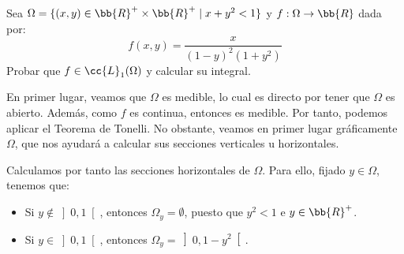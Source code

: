\begin{ejercicio}
    Sea $\Omega=\{(x,y)\in \bb{R}^+\times \bb{R}^+\mid x+y^2<1\}$ y $f:\Omega\to \bb{R}$ dada por:
    \[ f(x,y)=\dfrac{x}{(1-y)^2(1+y^2)} \]
    Probar que $f\in \cc{L}_1(\Omega)$ y calcular su integral.

    En primer lugar, veamos que $\Omega$ es medible, lo cual es directo por tener que $\Omega$ es abierto. Además, como $f$ es continua, entonces
    es medible. Por tanto, podemos aplicar el Teorema de Tonelli.
    No obstante, veamos en primer lugar gráficamente $\Omega$, que nos ayudará a calcular sus secciones verticales u horizontales.
    \begin{figure}[H]
        \centering
    \end{figure}

    Calculamos por tanto las secciones horizontales de $\Omega$. Para ello, fijado $y\in \Omega$, tenemos que:
    \begin{itemize}
        \item Si $y\notin \left]0,1\right[$, entonces $\Omega_y=\emptyset$, puesto que $y^2<1$ e $y\in \bb{R}^+$.
        \item Si $y\in \left]0,1\right[$, entonces $\Omega_y=\left]0,1-y^2\right[$.
    \end{itemize}


\end{ejercicio}
